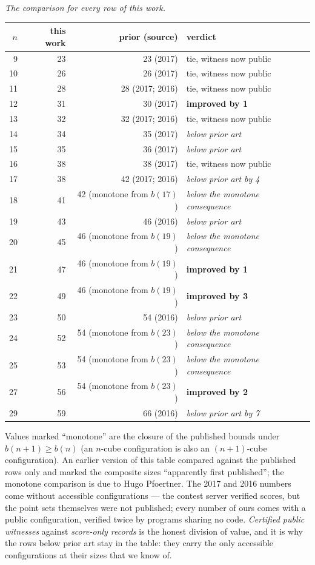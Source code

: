 \documentclass[11pt,a4paper]{article}
\begin{document}
\emph{The comparison for every row of this work.}
\begin{center}
\begin{tabular}{rrrl}
\toprule
$n$ & this work & prior (source) & verdict\\
\midrule
 9 & 23 & 23 (2017) & tie, witness now public\\
10 & 26 & 26 (2017) & tie, witness now public\\
11 & 28 & 28 (2017; 2016) & tie, witness now public\\
12 & 31 & 30 (2017) & \textbf{improved by 1}\\
13 & 32 & 32 (2017; 2016) & tie, witness now public\\
14 & 34 & 35 (2017) & \emph{below prior art}\\
15 & 35 & 36 (2017) & \emph{below prior art}\\
16 & 38 & 38 (2017) & tie, witness now public\\
17 & 38 & 42 (2017; 2016) & \emph{below prior art by 4}\\
18 & 41 & 42 (monotone from $b(17)$) & \emph{below the monotone consequence}\\
19 & 43 & 46 (2016) & \emph{below prior art}\\
20 & 45 & 46 (monotone from $b(19)$) & \emph{below the monotone consequence}\\
21 & 47 & 46 (monotone from $b(19)$) & \textbf{improved by 1}\\
22 & 49 & 46 (monotone from $b(19)$) & \textbf{improved by 3}\\
23 & 50 & 54 (2016) & \emph{below prior art}\\
24 & 52 & 54 (monotone from $b(23)$) & \emph{below the monotone consequence}\\
25 & 53 & 54 (monotone from $b(23)$) & \emph{below the monotone consequence}\\
27 & 56 & 54 (monotone from $b(23)$) & \textbf{improved by 2}\\
29 & 59 & 66 (2016) & \emph{below prior art by 7}\\
\bottomrule
\end{tabular}
\end{center}
Values marked ``monotone'' are the closure of the published bounds under $b(n+1)\ge b(n)$
(an $n$-cube configuration is also an $(n+1)$-cube configuration).  An earlier version of this table
compared against the published rows only and marked the composite sizes ``apparently first
published''; the monotone comparison is due to Hugo Pfoertner.  The 2017 and 2016 numbers come without accessible configurations --- the contest server verified
scores, but the point sets themselves were not published; every number of ours comes with a public
configuration, verified twice by programs sharing no code.  \emph{Certified public witnesses} against
\emph{score-only records} is the honest division of value, and it is why the rows below prior art stay
in the table: they carry the only accessible configurations at their sizes that we know of.
\end{document}
